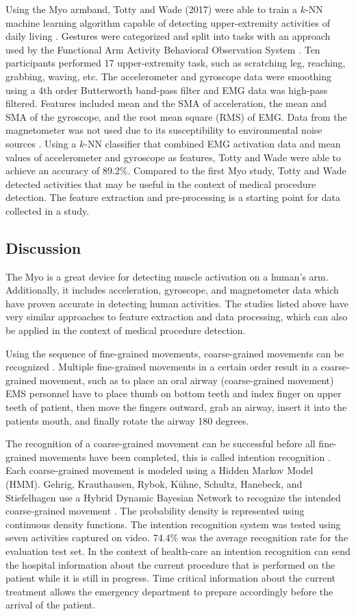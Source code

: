 \par Using the Myo armband, Totty and Wade (2017) were able to train a $k$-NN machine learning algorithm capable of detecting upper-extremity activities of daily living \cite{Totty2017}. Gestures were categorized and split into tasks with an approach used by the Functional Arm Activity Behavioral Observation System \cite{FAABOS}. Ten participants performed 17 upper-extremity task, such as scratching leg, reaching, grabbing, waving, etc. The accelerometer and gyroscope data were smoothing using a 4th order Butterworth band-pass filter and EMG data was high-pass filtered. Features included mean and the SMA of acceleration, the mean and SMA of the gyroscope, and the root mean square (\gls{RMS}) of EMG. Data from the magnetometer was not used due to its susceptibility to environmental noise sources \cite{Ahmad2013}. Using a $k$-NN classifier that combined EMG activation data and mean values of accelerometer and gyroscope as features, Totty and Wade were able to achieve an accuracy of 89.2\%.
Compared to the first Myo study, Totty and Wade detected activities that may be useful in the context of medical procedure detection. The feature extraction and pre-processing is a starting point for data collected in a study.
\subsection{Discussion}
The Myo is a great device for detecting muscle activation on a human's arm. Additionally, it includes acceleration, gyroscope, and magnetometer data which have proven accurate in detecting human activities. The studies listed above have very similar approaches to feature extraction and data processing, which can also be applied in the context of medical procedure detection.
\par Using the sequence of fine-grained movements, coarse-grained movements can be recognized \cite{Dirk2010}. Multiple fine-grained movements in a certain order result in a coarse-grained movement, such as to place an oral airway (coarse-grained movement) EMS personnel have to place thumb on bottom teeth and index finger on upper teeth of patient, then move the fingers outward, grab an airway, insert it into the patients mouth, and finally rotate the airway 180 degrees.
\par The recognition of a coarse-grained movement can be successful before all fine-grained movements have been completed, this is called intention recognition \cite{Schrempf2005}. Each coarse-grained movement is modeled using a Hidden Markov Model (HMM). Gehrig, Krauthausen, Rybok, K{\"{u}}hne, Schultz, Hanebeck, and Stiefelhagen use a Hybrid Dynamic Bayesian Network to recognize the intended coarse-grained movement \cite{Gehrig2011}. The probability density is represented using continuous density functions. The intention recognition system was tested using seven activities captured on video. 74.4\% was the average recognition rate for the evaluation test set. In the context of health-care an intention recognition can send the hospital information about the current procedure that is performed on the patient while it is still in progress. Time critical information about the current treatment allows the emergency department to prepare accordingly before the arrival of the patient.
